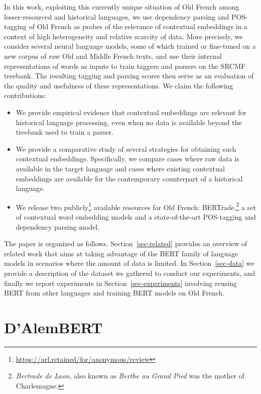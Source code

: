 In this work, exploiting this currently unique situation of Old French among lesser-resourced and historical languages, we use dependency parsing and POS-tagging of Old French as probes of the relevance of contextual embeddings in a context of high heterogeneity and relative scarcity of data.
More precisely, we consider several neural language models, some of which trained or fine-tuned on a new corpus of raw Old and Middle French texts, and use their internal representations of words as inputs to train taggers and parsers on the SRCMF treebank. The resulting tagging and parsing scores then serve as an evaluation of the quality and usefulness of these representations.
We claim the following contributions:
%
\begin{itemize}
    \item We provide empirical evidence that contextual embeddings are relevant for historical language processing, even when no data is available beyond the treebank used to train a parser.
    \item We provide a comparative study of several strategies for obtaining such contextual embeddings. Specifically, we compare cases where raw data is available in the target language and cases where existing contextual embeddings are available for the contemporary counterpart of a historical language.
    \item We release two publicly\footnote{\url{https://url.retained/for/anonymous/review}} available resources for Old French: BERTrade,\footnote{\emph{Bertrade de Laon}, also known as \emph{Berthe au Grand Pied} was the mother of Charlemagne.} a set of contextual word embedding models and a state-of-the-art POS-tagging and dependency parsing model.
\end{itemize}

The paper is organized as follows. Section~\ref{sec-related} provides an overview of related work that aims at taking advantage of the BERT family of language models in scenarios where the amount of data is limited. In Section~\ref{sec-data} we provide a description of the dataset we gathered to conduct our experiments, and finally we report experiments in Section~\ref{sec-experiments} involving reusing BERT from other languages and training BERT models on Old French.

\section{D'AlemBERT}

